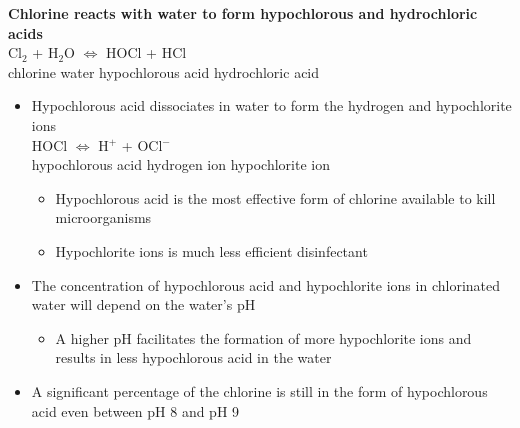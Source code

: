\textbf{Chlorine reacts with water to form hypochlorous and hydrochloric acids}\\
Cl$_2$ \hspace{0.8cm}	+ \hspace{0.3 cm}	 H$_2$O		\hspace{0.8cm} $\iff$ 
\hspace{0.8cm} HOCl	\hspace{0.8cm}	 +	\hspace{0.8cm}	 HCl \\
chlorine \hspace{0.8cm}	water \hspace{1.8cm}		 hypochlorous acid	\hspace{0.1cm}	 hydrochloric acid\\ 
	\vspace{0.5cm}
	\begin{itemize}
		\item Hypochlorous acid dissociates in water to form the hydrogen and hypochlorite ions\\
 HOCl \hspace{1.8 cm} $\iff$ \hspace{1.8 cm} H$^+$ \hspace{1.8cm} + 	\hspace{0.8cm}OCl$^-$\\ 
hypochlorous acid  \hspace{1.9 cm}      hydrogen ion   \hspace{1.5cm}           hypochlorite ion

		\begin{itemize}
			\item Hypochlorous acid is the most effective form of chlorine available to kill microorganisms
			\item Hypochlorite ions is much less efficient disinfectant
		\end{itemize}

		\item The concentration of hypochlorous acid and hypochlorite ions in chlorinated water will depend on the water's pH
		\begin{itemize}
			\item A higher pH facilitates the formation of more hypochlorite ions and results in less hypochlorous acid in the water
		\end{itemize}
		\item A significant percentage of the chlorine is still in the form of hypochlorous acid even between pH 8 and pH 9
		\end{itemize}


